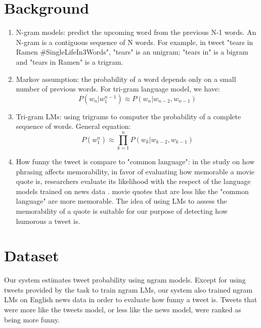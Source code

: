 \documentclass[a0,portrait]{a0poster}
\begin{document}
\begin{multicols}{2}
\section*{\LARGE Background}
\begin{enumerate}
\item N-gram models: predict the upcoming word from the previous N-1 words. An N-gram is a contiguous sequence of N words. For example, in tweet "tears in Ramen \#SingleLifeIn3Words", "tears" is an unigram; "tears in" is a bigram and "tears in Ramen" is a trigram.
\item Markov assumption: the probability of a word depends only on a small number of previous words. For tri-gram language model, we have:
\begin{equation}
P(w_n|w_1^{n-1})\approx P(w_n|w_{n-2}, w_{n-1})
\end{equation}
\item Tri-gram LMs: using trigrams to computer the probability of a complete sequence of words. General equation:
\begin{equation}
P(w_1^n)\approx \prod_{k=1}^{n} P(w_k|w_{k-2}, w_{k-1})
\end{equation}
\item How funny the tweet is compare to "common language": in the study on how phrasing affects memorability, in favor of evaluating how memorable a movie quote is, researchers evaluate its likelihood with the respect of the language models trained on news data \cite{hello}. movie quotes that are less like the "common language" are more memorable. The idea of using LMs to assess the memorability of a quote is suitable for our purpose of detecting how humorous a tweet is. 
\end{enumerate}

\color{Navy}

\section*{\LARGE Dataset}
Our system estimates tweet probability using ngram models. Except for using tweets provided by the task to train ngram LMs, our system also trained ngram LMs on English news data in order to evaluate how funny a tweet is. Tweets that were more like the tweets model, or less like the news model, were ranked as being more funny.


\end{multicols}
\end{document}
